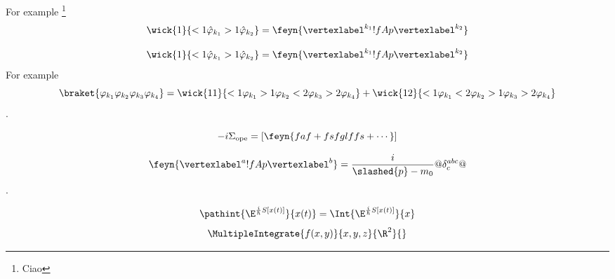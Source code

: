 \begin{pabox}
   For example%
   \footnote{Ciao}
   \begin{dmath}[compact]
   \wick{1}{<1 \hat{\varphi}_{k_{1}} >1\hat{\varphi}_{k_{2}} }=
   \feyn{\vertexlabel^{k_{1}} !{fA}p \vertexlabel^{k_{2}}}
   \end{dmath}
\end{pabox}
\begin{dmath}[compact]
   \wick{1}{<1 \hat{\varphi}_{k_{1}} >1\hat{\varphi}_{k_{2}} }=
   \feyn{\vertexlabel^{k_{1}} !{fA}p \vertexlabel^{k_{2}}}
\end{dmath}
For example
\begin{dmath}
   \braket{\varphi_{k_{1}}\varphi_{k_{2}}\varphi_{k_{3}} \varphi_{k_{4}}}
   = 
   \wick{11}{<1 \varphi_{k_{1}} >1\varphi_{k_{2}} <2 \varphi_{k_{3}} >2
      \varphi_{k_{4}}}
   +
   \wick{12}{<1 \varphi_{k_{1}} <2\varphi_{k_{2}} >1 \varphi_{k_{3}} >2
      \varphi_{k_{4}}}
\end{dmath}.

\begin{dmath}
   -i\Sigma_{\text{ope}} = \left[ \feyn{faf + fsfglffs + \cdots}\right]
\end{dmath}

\begin{dmath}
   \feyn{\vertexlabel^{a} !{fA}p \vertexlabel^{b}} = \frac{ i}
   {\slashed{p} -m_{0}}
   @\delta^{abc}_{c}@ 
\end{dmath}.

\begin{dmath}
   \pathint{\E^{\frac{i}{\hslash}S[x(t)]}}{x(t)} = 
   \Int{\E^{\frac{i}{\hslash}S[x(t)]}}{x}
\end{dmath}
\begin{dmath}
   \MultipleIntegrate{f(x,y)}{x,y,z}{\R^{2}}{}
\end{dmath}
